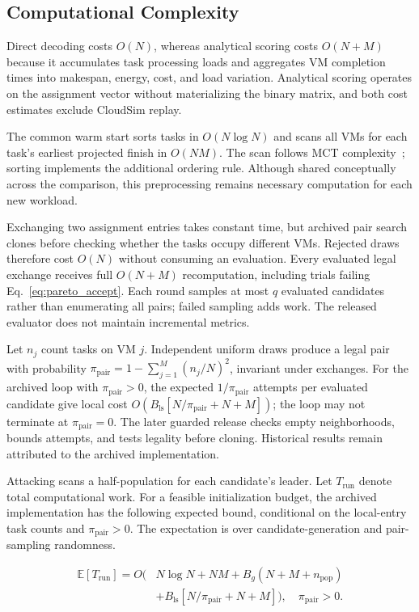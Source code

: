 \documentclass[pdflatex,onecolumn,sn-mathphys-num]{sn-jnl}
\begin{document}
\FloatBarrier
\subsection{Computational Complexity}\label{sec:complexity}
Direct decoding costs $O(N)$, whereas analytical scoring costs $O(N+M)$ because it accumulates task processing loads and aggregates VM completion times into makespan, energy, cost, and load variation. Analytical scoring operates on the assignment vector without materializing the binary matrix, and both cost estimates exclude CloudSim replay.

The common warm start sorts tasks in $O(N\log N)$ and scans all VMs for each task's earliest projected finish in $O(NM)$. The scan follows MCT complexity~\cite{Braun2001}; sorting implements the additional ordering rule. Although shared conceptually across the comparison, this preprocessing remains necessary computation for each new workload.

Exchanging two assignment entries takes constant time, but archived pair search clones before checking whether the tasks occupy different VMs. Rejected draws therefore cost $O(N)$ without consuming an evaluation. Every evaluated legal exchange receives full $O(N+M)$ recomputation, including trials failing Eq.~\eqref{eq:pareto_accept}. Each round samples at most $q$ evaluated candidates rather than enumerating all pairs; failed sampling adds work. The released evaluator does not maintain incremental metrics.

Let $n_j$ count tasks on VM $j$. Independent uniform draws produce a legal pair with probability $\pi_{\mathrm{pair}}=1-\sum_{j=1}^{M}(n_j/N)^2$, invariant under exchanges. For the archived loop with $\pi_{\mathrm{pair}}>0$, the expected $1/\pi_{\mathrm{pair}}$ attempts per evaluated candidate give local cost $O(B_{\mathrm{ls}}[N/\pi_{\mathrm{pair}}+N+M])$; the loop may not terminate at $\pi_{\mathrm{pair}}=0$. The later guarded release checks empty neighborhoods, bounds attempts, and tests legality before cloning. Historical results remain attributed to the archived implementation.

Attacking scans a half-population for each candidate's leader. Let $T_{\mathrm{run}}$ denote total computational work. For a feasible initialization budget, the archived implementation has the following expected bound, conditional on the local-entry task counts and $\pi_{\mathrm{pair}}>0$. The expectation is over candidate-generation and pair-sampling randomness.

\begin{equation}\label{eq:complexity_archived}
\begin{aligned}
\mathbb{E}[T_{\mathrm{run}}]=O\bigl(&N\log N+NM+B_g(N+M+n_{\mathrm{pop}})\\
&+B_{\mathrm{ls}}[N/\pi_{\mathrm{pair}}+N+M]\bigr),\quad \pi_{\mathrm{pair}}>0.
\end{aligned}
\end{equation}
\end{document}
